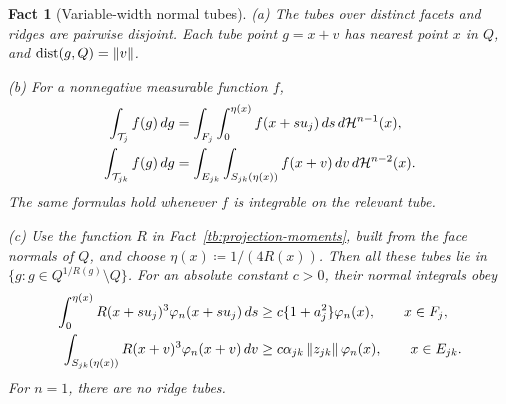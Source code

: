 \documentclass[11pt,letterpaper]{article}
\theoremstyle{plain}
\newtheorem{fact}{Fact}[section]
\begin{document}
\begin{fact}[Variable-width normal tubes]\label{tb:tubes}
(a) The tubes over distinct facets and ridges are pairwise disjoint.
Each tube point \(g=x+v\) has nearest point \(x\) in \(Q\), and
\(\operatorname{dist}(g,Q)=\left\lVert v\right\rVert\).

(b) For a nonnegative measurable function \(f\),
\begin{align*}
 \int_{\mathcal T_j}f(g)\,dg
 &=\int_{F_j}\int_0^{\eta(x)} f(x+s u_j)\,ds\,d\mathcal H^{n-1}(x),\\
 \int_{\mathcal T_{jk}}f(g)\,dg
 &=\int_{E_{jk}}\int_{S_{jk}(\eta(x))}f(x+v)\,dv\,d\mathcal H^{n-2}(x).
\end{align*}
The same formulas hold whenever \(f\) is integrable on the relevant tube.

(c) Use the function \(R\) in Fact~\ref{tb:projection-moments}, built
from the face normals of \(Q\), and choose \(\eta(x)\coloneqq 1/(4R(x))\).
Then all these tubes lie in \(\{g:g\in Q^{1/R(g)}\setminus Q\}\).
For an absolute constant \(c>0\), their normal integrals obey
\begin{align*}
 \int_0^{\eta(x)}R(x+s u_j)^3\varphi_n(x+s u_j)\,ds
 &\ge c\{1+a_j^2\}\varphi_n(x),\qquad x\in F_j,\\
 \int_{S_{jk}(\eta(x))}R(x+v)^3\varphi_n(x+v)\,dv
 &\ge c\alpha_{jk}\left\lVert z_{jk}\right\rVert\varphi_n(x),\qquad x\in E_{jk}.
\end{align*}
For \(n=1\), there are no ridge tubes.
\end{fact}
\end{document}
